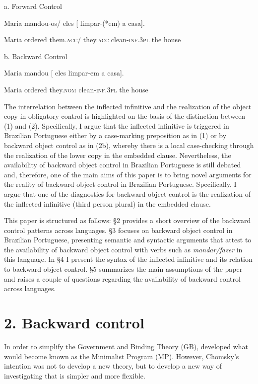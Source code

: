 \documentclass[output=paper]{langsci/langscibook}
\begin{document}
           a.  Forward Control

Maria  mandou-os/   eles        [  limpar-(*em) a     casa].   

    Maria ordered   them.\textsc{acc}/ they.\textsc{acc}      clean-\textsc{inf.3pl} the house

      b.  Backward Control

Maria mandou [    eles    limpar-em     a     casa].

    Maria  ordered    they.\textsc{nom}      clean-\textsc{inf.3pl}          the house

The interrelation between the inflected infinitive and the realization of the object copy in obligatory control is highlighted on the basis of the distinction between (1) and (2). Specifically, I argue that the inflected infinitive is triggered in Brazilian Portuguese either by a case-marking preposition as in (1) or by backward object control as in (2b), whereby there is a local case-checking through the realization of the lower copy in the embedded clause. Nevertheless, the availability of backward object control in Brazilian Portuguese is still debated and, therefore, one of the main aims of this paper is to bring novel arguments for the reality of backward object control in Brazilian Portuguese. Specifically, I argue that one of the diagnostics for backward object control is the realization of the inflected infinitive (third person plural) in the embedded clause.

This paper is structured as follows: §2 provides a short overview of the backward control patterns across languages. §3 focuses on backward object control in Brazilian Portuguese, presenting semantic and syntactic arguments that attest to the availability of backward object control with verbs such as \textit{mandar/fazer} in this language. In §4 I present the syntax of the inflected infinitive and its relation to backward object control. §5 summarizes the main assumptions of the paper and raises a couple of questions regarding the availability of backward control across languages.

\section{ 2. Backward control}

In order to simplify the Government and Binding Theory (GB), \citet{Chomsky1993} developed what would become known as the Minimalist Program (MP). However, Chomsky’s intention was not to develop a new theory, but to develop a new way of investigating that is simpler and more flexible.
\end{document}
